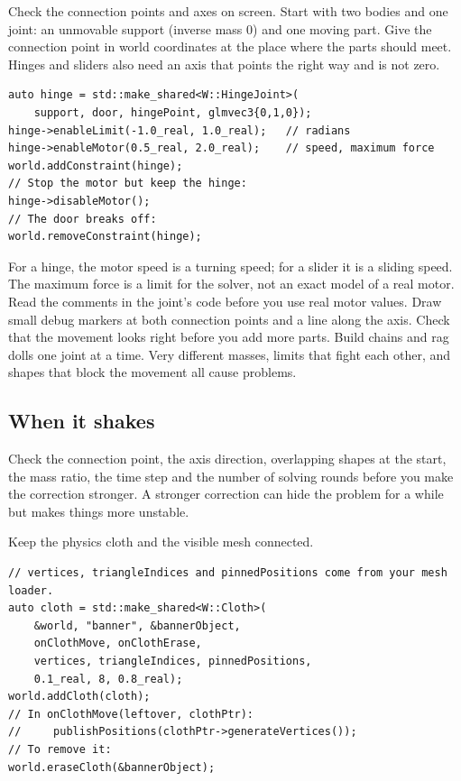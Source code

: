 \documentclass[11pt,a4paper]{article}
\begin{document}
\label{vpe-core-26}
Check the connection points and axes on screen. Start with two bodies and one joint: an unmovable support (inverse mass 0) and one moving part. Give the connection point in world coordinates at the place where the parts should meet. Hinges and sliders also need an axis that points the right way and is not zero.

\begin{lstlisting}
auto hinge = std::make_shared<W::HingeJoint>(
    support, door, hingePoint, glmvec3{0,1,0});
hinge->enableLimit(-1.0_real, 1.0_real);   // radians
hinge->enableMotor(0.5_real, 2.0_real);    // speed, maximum force
world.addConstraint(hinge);
// Stop the motor but keep the hinge:
hinge->disableMotor();
// The door breaks off:
world.removeConstraint(hinge);
\end{lstlisting}

For a hinge, the motor speed is a turning speed; for a slider it is a sliding speed. The maximum force is a limit for the solver, not an exact model of a real motor. Read the comments in the joint's code before you use real motor values. Draw small debug markers at both connection points and a line along the axis. Check that the movement looks right before you add more parts. Build chains and rag dolls one joint at a time. Very different masses, limits that fight each other, and shapes that block the movement all cause problems.

\subsection*{When it shakes}
Check the connection point, the axis direction, overlapping shapes at the start, the mass ratio, the time step and the number of solving rounds before you make the correction stronger. A stronger correction can hide the problem for a while but makes things more unstable.

\label{vpe-core-27}
Keep the physics cloth and the visible mesh connected.

\begin{lstlisting}
// vertices, triangleIndices and pinnedPositions come from your mesh loader.
auto cloth = std::make_shared<W::Cloth>(
    &world, "banner", &bannerObject,
    onClothMove, onClothErase,
    vertices, triangleIndices, pinnedPositions,
    0.1_real, 8, 0.8_real);
world.addCloth(cloth);
// In onClothMove(leftover, clothPtr):
//     publishPositions(clothPtr->generateVertices());
// To remove it:
world.eraseCloth(&bannerObject);
\end{lstlisting}
\end{document}
